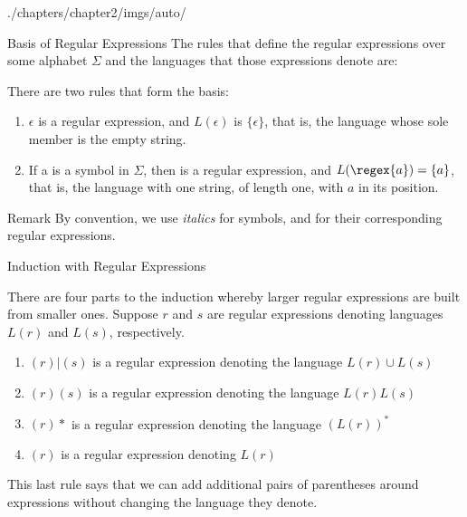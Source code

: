 \begin{graphicspathcontext}{{./chapters/chapter2/imgs/auto/}}
\begin{bibunit}[apalike]
\begin{frame}{Basis of Regular Expressions}
	The rules that define the regular expressions over some alphabet $\Sigma$ and the languages that those expressions denote are:
	\begin{definition}[BASIS]
	There are two rules that form the basis: \begin{enumerate}
	\item $\epsilon$ is a regular expression, and $L(\epsilon)$ is $\{\epsilon\}$, that is, the language whose sole member is the empty string.
	\item If a is a symbol in $\Sigma$, then  is a regular expression, and $L(\regex{a}) = \{a\}$, that is, the language with one string, of length one, with $a$ in its position.
	\end{enumerate}
	\end{definition}
	\begin{block}{\smaller Remark}\smaller 
		By convention, we use \textit{italics} for symbols, and  for their corresponding regular expressions.
	\end{block}
\end{frame}

\begin{frame}{Induction with Regular Expressions}
	\begin{definition}[INDUCTION]
	There are four parts to the induction whereby larger regular expressions are built from smaller ones. Suppose $r$ and $s$ are regular expressions denoting languages $L(r)$ and $L(s)$, respectively.
	\begin{enumerate}
	\item $(r)|(s)$ is a regular expression denoting the language $L(r) \cup L(s)$
	\item $(r)(s)$ is a regular expression denoting the language $L(r)L(s)$
	\item $(r)*$ is a regular expression denoting the language $(L(r))^*$
	\item $(r)$ is a regular expression denoting $L(r)$
	\end{enumerate}
	\end{definition}
	This last rule says that we can add additional pairs of parentheses around expressions without changing the language they denote.
\end{frame}


\end{bibunit}
\end{graphicspathcontext}
